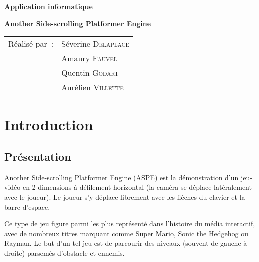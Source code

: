 \documentclass[a4paper,11pt]{article}
\begin{document}
\begin{titlepage}
\hspace{3cm}
\vspace{4cm}
\begin{center}
\begin{Huge}
\bfseries Application informatique
\end{Huge}
\vspace{3cm}

\begin{Huge}
\bfseries Another Side-scrolling Platformer Engine
\end{Huge}
\end{center}

\vspace{2cm}

\begin{center}
\begin{large}
\begin{tabular}{ll}
  Réalisé par~: & Séverine \textsc{Delaplace}\\
  				& Amaury \textsc{Fauvel}\\
                & Quentin \textsc{Godart}\\
                & Aurélien \textsc{Villette}\\
\end{tabular}
\end{large}
\end{center}
\end{titlepage}



\newpage
\tableofcontents
\newpage




\vspace{1cm}
\section{Introduction}
\subsection{Présentation}
Another Side-scrolling Platformer Engine (ASPE) est la démonstration d'un jeu-vidéo en 2 dimensions à défilement horizontal (la caméra se déplace latéralement avec le joueur). Le joueur s'y déplace librement avec les flèches du clavier et la barre d'espace.

Ce type de jeu figure parmi les plus représenté dans l'histoire du média interactif, avec de nombreux titres marquant comme Super Mario, Sonic the Hedgehog ou Rayman. Le but d'un tel jeu est de parcourir des niveaux (souvent de gauche à droite) parsemés d'obstacle et ennemis.
\end{document}

